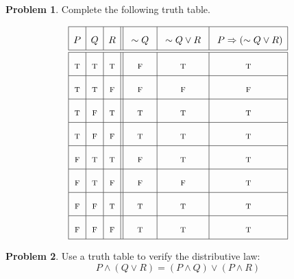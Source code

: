 \documentclass[12pt]{amsart}
\newcounter{problem_number}[section]
\theoremstyle{named}
\theoremstyle{definition}
\newtheorem{problem}{Problem}
\begin{document}
\begin{problem}
	Complete the following truth table.
\end{problem}

$$
\renewcommand{\arraystretch}{2}
\begin{array}{|c|c|c||c|c|c|}
\hline
P&Q&R&\ \sim Q \  &\ \sim Q\vee R\  &\ P\Rightarrow (\sim Q\vee R) \\
\hline\hline
\textsc{t}&\textsc{t}&\textsc{t}& \textsc{f}& \textsc{t}& \textsc{t}\\
\hline
\textsc{t}&\textsc{t}&\textsc{f}& \textsc{f}& \textsc{f}& \textsc{f}\\
\hline
\textsc{t}&\textsc{f}&\textsc{t}& \textsc{t}& \textsc{t}& \textsc{t}\\
\hline
\textsc{t}&\textsc{f}&\textsc{f}& \textsc{t}& \textsc{t}& \textsc{t}\\
\hline
\textsc{f}&\textsc{t}&\textsc{t}& \textsc{f}& \textsc{t}& \textsc{t}\\
\hline
\textsc{f}&\textsc{t}&\textsc{f}& \textsc{f}& \textsc{f}& \textsc{t}\\
\hline
\textsc{f}&\textsc{f}&\textsc{t}& \textsc{t}& \textsc{t}& \textsc{t}\\
\hline
\textsc{f}&\textsc{f}&\textsc{f}& \textsc{t}& \textsc{t}& \textsc{t}\\
\hline
\end{array}
$$


\newpage

\begin{problem}
	Use a truth table to verify the distributive law:
	$$P\wedge(Q\vee R) = (P\wedge Q)\vee(P\wedge R)$$
\end{problem}
\end{document}
